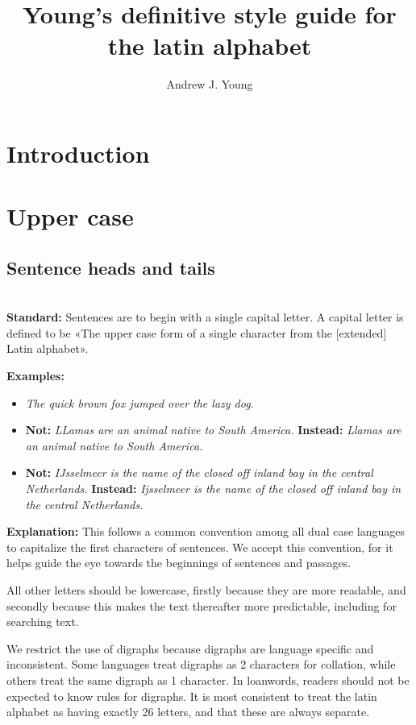 \documentclass{article}
\title{Young's definitive style guide for the latin alphabet}
\author{Andrew J. Young}
\newcommand{\standard}[1]{\quad  \\ \textbf{Standard:} {#1}}
\newcommand{\examples}[1]{
\textbf{Examples:} \begin{itemize}
#1
\end{itemize}
}
\newcommand{\example}[1]{\item \textit{#1}}
\newcommand{\nonexample}[2]{\item \textbf{Not:} \textit{#1} \textbf{Instead:}
  \textit{#2}}
\newcommand{\explanation}[1]{\textbf{Explanation:} #1}
\begin{document}
\maketitle

\begin{abstract}
\end{abstract}

\section{Introduction}
\label{sec:intro}

\section{Upper case}

\subsection{Sentence heads and tails}

\label{s:upper_case:sentence_heads}
\standard{Sentences are to begin with a single capital letter. A capital letter
is defined to be «The upper case form of a single character from the [extended]
Latin alphabet».}

\examples{
  \example{The quick brown fox jumped over the lazy dog.}
  \nonexample{LLamas are an animal native to South America.}{Llamas are an
  animal native to South America.}
  \nonexample{IJsselmeer is the name of the closed off inland bay in the central
  Netherlands.}{Ijsselmeer is the name of the closed off inland bay in the
  central Netherlands.}
}

\explanation{This follows a common convention among all dual case languages to
capitalize the first characters of sentences. We accept this convention, for it
helps guide the eye towards the beginnings of sentences and passages.

All other letters should be lowercase, firstly because they are more readable,
and secondly because this makes the text thereafter more predictable, including
for searching text.

We restrict the use of digraphs because digraphs are language specific and
inconsistent. Some languages treat digraphs as 2 characters for collation, while
others treat the same digraph as 1 character. In loanwords, readers should not
be expected to know rules for digraphs. It is most consistent to treat the latin
alphabet as having exactly 26 letters, and that these are always separate.
}
\end{document}
